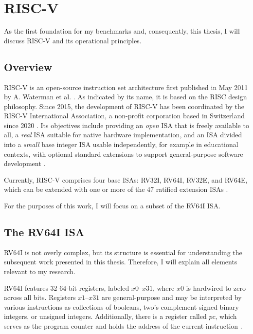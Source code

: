 \chapter{RISC-V}\label{chap:riscv}

As the first foundation for my benchmarks and, consequently, this thesis, I
will discuss RISC-V and its operational principles.

\section{Overview}

RISC-V is an open-source instruction set architecture first published in May
2011 by A. Waterman et al. \cite{first_riscv}. As indicated by its name, it is
based on the RISC design philosophy.  Since
2015, the development of RISC-V has been coordinated by the RISC-V
International Association, a non-profit corporation based in Switzerland since
2020 \cite{riscvorg}. Its objectives include providing an \emph{open} ISA that
is freely available to all, a \emph{real} ISA suitable for native hardware
implementation, and an ISA divided into a \emph{small} base integer ISA usable
independently, for example in educational contexts, with optional standard
extensions to support general-purpose software development \cite[Chapter
      1]{riscv-isa}.

Currently, RISC-V comprises four base ISAs: RV32I, RV64I, RV32E, and RV64E,
which can be extended with one or more of the 47 ratified extension ISAs
\cite[Preface]{riscv-isa}.

 

For the purposes of this work, I will focus on a subset of the RV64I ISA.

\section{The RV64I ISA}
RV64I is not overly complex, but its structure is essential for understanding
the subsequent work presented in this thesis. Therefore, I will explain all
elements relevant to my research.

RV64I features 32 64-bit registers, labeled $x0$–$x31$, where $x0$ is hardwired
to zero across all bits. Registers $x1$–$x31$ are general-purpose and may be
interpreted by various instructions as collections of booleans, two's
complement signed binary integers, or unsigned integers. Additionally, there is
a register called $pc$, which serves as the program counter and holds the
address of the current instruction \cite[Chapters 4.1, 2.1]{riscv-isa}.


